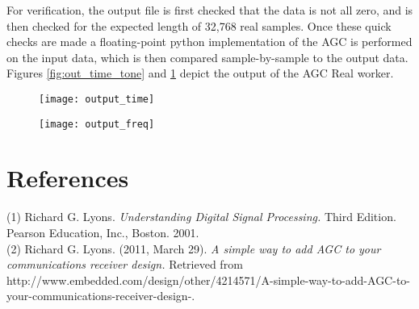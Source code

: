 \begin{flushleft}
	For verification, the output file is first checked that the data is not all zero, and is then checked for the expected length of 32,768 real samples. Once these quick checks are made a floating-point python implementation of the AGC is performed on the input data, which is then compared sample-by-sample to the output data. Figures \ref{fig:out_time_tone} and \ref{fig:out_freq_tone} depict the output of the AGC Real worker.
\end{flushleft}
\newpage

	\begin{figure}[ht]
		\centering
		\begin{minipage}{.5\textwidth}
			\centering\texttt{[image: output\_time]}
			\label{fig:out_time_tone}
		\end{minipage}%
		\begin{minipage}{.5\textwidth}
			\centering\texttt{[image: output\_freq]}
			\label{fig:out_freq_tone}
		\end{minipage}
	\end{figure}

\section*{References}
(1) Richard G. Lyons. \textit{Understanding Digital Signal Processing.} Third Edition. Pearson Education, Inc., Boston. 2001. \\
(2) Richard G. Lyons. (2011, March 29). \textit{A simple way to add AGC to your communications receiver design.} Retrieved from http://www.embedded.com/design/other/4214571/A-simple-way-to-add-AGC-to-your-communications-receiver-design-.


